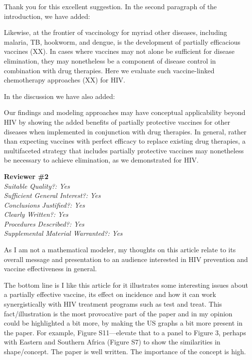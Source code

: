 \documentclass[12pt]{jpmletter}
\newcommand{\section}[1]{\textbf{#1}\\}
\newenvironment{original}{\it}{}
\begin{document}
\begin{letter}{}
    Thank you for this excellent suggestion. In the second paragraph
    of the introduction, we have added:
    \begin{quoting}
      Likewise, at the frontier of vaccinology for myriad other
      diseases, including malaria, TB, hookworm, and dengue, is the
      development of partially efficacious vaccines (XX). In cases
      where vaccines may not alone be sufficient for disease
      elimination, they may nonetheless be a component of disease
      control in combination with drug therapies. Here we evaluate
      such vaccine-linked chemotherapy approaches (XX) for HIV.
    \end{quoting}
    
    In the discussion we have also added:
    \begin{quoting}
      Our findings and modeling approaches may have conceptual
      applicability beyond HIV by showing the added benefits of
      partially protective vaccines for other diseases when
      implemented in conjunction with drug therapies. In general,
      rather than expecting vaccines with perfect efficacy to replace
      existing drug therapies, a multifaceted strategy that includes
      partially protective vaccines may nonetheless be necessary to
      achieve elimination, as we demonstrated for HIV.
    \end{quoting}
    
    \section{Reviewer \#2}
    \begin{original}
      Suitable Quality?: Yes \\
      Sufficient General Interest?: Yes \\
      Conclusions Justified?: Yes \\
      Clearly Written?: Yes \\
      Procedures Described?: Yes \\
      Supplemental Material Warranted?: Yes
 
      As I am not a mathematical modeler, my thoughts on this article
      relate to its overall message and presentation to an audience
      interested in HIV prevention and vaccine effectiveness in
      general.

      The bottom line is I like this article for it illustrates some
      interesting issues about a partially effective vaccine, its
      effect on incidence and how it can work synergistically with HIV
      treatment programs such as test and treat. This
      fact/illustration is the most provocative part of the paper and
      in my opinion could be highlighted a bit more, by making the US
      graphs a bit more present in the paper. For example, Figure
      S11—elevate that to a panel to Figure 3, perhaps with Eastern
      and Southern Africa (Figure S7) to show the similarities in
      shape/concept. The paper is well written. The importance of the
      concept is high.
    \end{original}
    

\end{letter}
\end{document}
